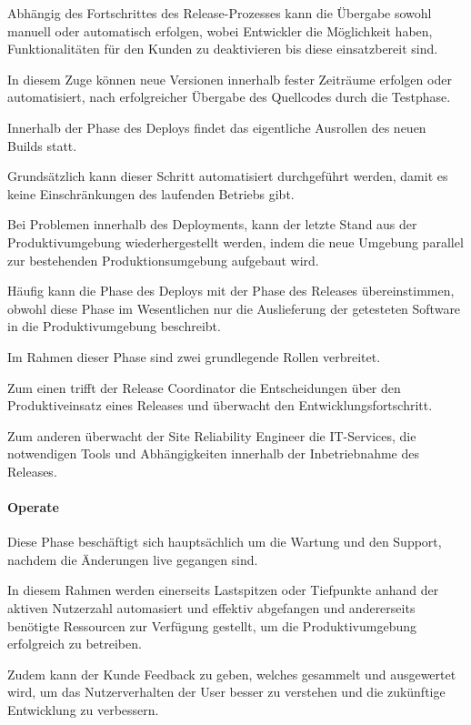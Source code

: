 Abhängig des Fortschrittes des Release-Prozesses kann die Übergabe sowohl manuell oder automatisch erfolgen, wobei Entwickler die Möglichkeit haben, Funktionalitäten für den Kunden zu deaktivieren bis diese einsatzbereit sind. \cite{thedev_eight_2019}

In diesem Zuge können neue Versionen innerhalb fester Zeiträume erfolgen oder automatisiert, nach erfolgreicher Übergabe des Quellcodes durch die Testphase. \cite{thedev_eight_2019}

Innerhalb der Phase des Deploys findet das eigentliche Ausrollen des neuen Builds statt.  

Grundsätzlich kann dieser Schritt automatisiert durchgeführt werden, damit es keine Einschränkungen des laufenden Betriebs gibt. \cite{thedev_eight_2019}  

Bei Problemen innerhalb des Deployments, kann der letzte Stand aus der Produktivumgebung wiederhergestellt werden, indem die neue Umgebung parallel zur bestehenden Produktionsumgebung aufgebaut wird. 

Häufig kann die Phase des Deploys mit der Phase des Releases übereinstimmen, obwohl diese Phase im Wesentlichen nur die Auslieferung der getesteten Software in die Produktivumgebung beschreibt. \cite[S. 20]{halstenberg_devops_2020}   

Im Rahmen dieser Phase sind zwei grundlegende Rollen verbreitet. \cite[s. 20]{halstenberg_devops_2020} 

Zum einen trifft der Release Coordinator die Entscheidungen über den Produktiveinsatz eines Releases und überwacht den Entwicklungsfortschritt. 

Zum anderen überwacht der Site Reliability Engineer die IT-Services, die notwendigen Tools und Abhängigkeiten innerhalb der Inbetriebnahme des Releases. 

\paragraph{Operate}

Diese Phase beschäftigt sich hauptsächlich um die Wartung und den Support, nachdem die Änderungen live gegangen sind. 

In diesem Rahmen werden einerseits Lastspitzen oder Tiefpunkte anhand der aktiven Nutzerzahl automasiert und effektiv abgefangen und andererseits benötigte Ressourcen zur Verfügung gestellt, um die Produktivumgebung erfolgreich zu betreiben. \cite{thedev_eight_2019}    

Zudem kann der Kunde Feedback zu geben, welches gesammelt und ausgewertet wird, um das Nutzerverhalten der User besser zu verstehen und die zukünftige Entwicklung zu verbessern. 

